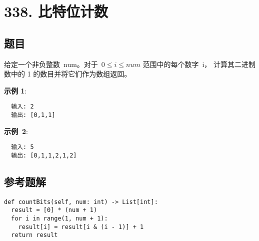 \newpage
\section{338. 比特位计数}
\label{leetcode:338}

\subsection{题目}

给定一个非负整数 num。对于 $0 \leq i \leq num$ 范围中的每个数字 i，
计算其二进制数中的 1 的数目并将它们作为数组返回。

\textbf{示例 1}:

\begin{verbatim}
  输入: 2
  输出: [0,1,1]
\end{verbatim}

\textbf{示例 2}:

\begin{verbatim}
  输入: 5
  输出: [0,1,1,2,1,2]
\end{verbatim}

\subsection{参考题解}

\begin{verbatim}
def countBits(self, num: int) -> List[int]:
  result = [0] * (num + 1)
  for i in range(1, num + 1):
    result[i] = result[i & (i - 1)] + 1
  return result
\end{verbatim}
